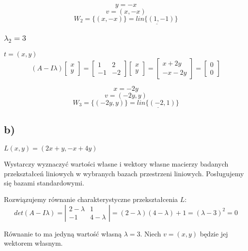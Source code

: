 \documentclass{article}
\begin{document}
$$y = -x$$
$$v = (x,-x)$$ 
$$W_{2} = \{(x,-x)\} = \underline{lin\{(1,-1)\}}$$

\subsubsection{$\lambda_{2} = 3$}

$t = (x,y)$
$$(A-I\lambda)\left[\begin{array}{c}x\\y\end{array}\right] =\left[\begin{array}{cc}1&2\\-1&-2\end{array}\right] \left[\begin{array}{c}x\\y\end{array}\right] = \left[\begin{array}{c}x+2y\\-x-2y\end{array}\right] = \left[\begin{array}{c}0\\0\end{array}\right] $$

$$x = -2y$$
$$v = (-2y,y)$$ 
$$W_{3} = \{(-2y,y)\} = \underline{lin\{(-2,1)\}} $$

\subsection{b)}

$L(x,y) = (2x+y,-x+4y)$ \newline

Wystarczy wyznaczyć wartości własne i wektory własne macierzy badanych przekształceń liniowych w wybranych bazach przestrzeni liniowych. Posługujemy się bazami standardowymi. \newline

Rozwiązujemy równanie charakterystyczne przekształcenia $L$:
$$det(A - I\lambda) = \left|\begin{array}{cc}2-\lambda&1\\-1&4-\lambda\end{array}\right| = (2-\lambda)(4-\lambda)+1 = (\lambda-3)^{2} = 0$$

Równanie to ma jedyną wartość własną $\lambda = 3$. Niech $v = (x,y)$ będzie jej wektorem własnym.
\end{document}
